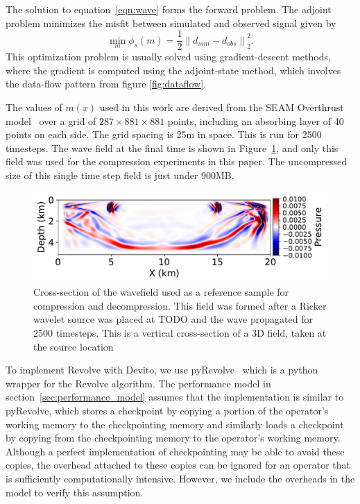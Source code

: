 \documentclass[conference]{IEEEtran}
\begin{document}
The solution to equation~\ref{eqn:wave} forms the forward problem. The adjoint
problem minimizes the misfit between simulated and observed signal given by
\begin{equation}
\min_{m} \phi_s(m) = \frac{1}{2} \left\lVert d_{sim} - d_{obs} \right\rVert_2^2.
\end{equation}
This optimization problem is usually solved using gradient-descent methods,
where the gradient is computed using the adjoint-state method, which involves
the data-flow pattern from figure \ref{fig:dataflow}.

The values of $m(x)$ used in this work are derived from the SEAM Overthrust
model~\cite{aminzadeh1996three} over a grid of $287 \times 881 \times 881$
points, including an absorbing layer of 40 points on each side. The grid spacing
is 25m in space. This is run for 2500 timesteps. The wave field
at the final time is shown in Figure~\ref{fig:uncompressed}, and only this field
was used for the compression experiments in this paper. The uncompressed size of
this single time step field is just under 900MB.

\begin{figure}
\begin{center}
\includegraphics[width=0.8\linewidth]{images/uncompressed.pdf}
\end{center}
\caption{Cross-section of the wavefield used as a reference sample for
  compression and decompression. This field was formed after a Ricker
  wavelet source was placed at TODO and the wave propagated for 2500
  timesteps. This is a vertical cross-section of a 3D field, taken at
  the source location}
\label{fig:uncompressed}
\end{figure}

To implement Revolve with Devito, we use pyRevolve~\cite{kukreja2018high} which
is a python wrapper for the Revolve algorithm. The performance model in
section~\ref{sec:performance_model} assumes that the implementation is similar
to pyRevolve, which stores a checkpoint by copying a portion of the operator's
working memory to the checkpointing memory and similarly loads a checkpoint by
copying from the checkpointing memory to the operator's working memory. Although
a perfect implementation of checkpointing may be able to avoid these copies, the
overhead attached to these copies can be ignored for an operator that is
sufficiently computationally intensive. However, we include the overheads in the
model to verify this assumption. 
\end{document}
